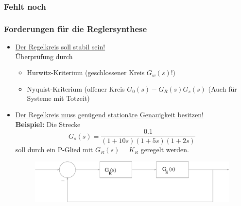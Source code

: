 \message{ !name(Mitschrieb_SysRegel.tex)}\documentclass[12pt,a4paper,ngerman]{scrartcl}
\newcommand{\RM}[1]{\MakeUppercase{\romannumeral #1{.}}}
\begin{document}
\subsubsection{Fehlt noch}
\subsubsection{Forderungen für die Reglersynthese}
\begin{itemize}
\item[\RM{1}] \underline{Der Regelkreis soll stabil sein!}\\
Überprüfung durch
\begin{itemize}
\item Hurwitz-Kriterium (geschlossener Kreis $G_w(s)$!)
\item Nyquist-Kriterium (offener Kreis $G_0(s)-G_R(s)G_s(s)$ (Auch für Systeme mit Totzeit)
\end{itemize}
\item[\RM{2}] \underline{Der Regelkreis muss genügend stationäre Genauigkeit besitzen!}\\
\textbf{Beispiel:} Die Strecke
\[
G_s(s)=\frac{0.1}{(1+10s)(1+5s)(1+2s)}
\]
soll durch ein P-Glied mit $G_R(s)=K_R$ geregelt werden.
\begin{figure}[H]
  \centering
  \includegraphics[width=.7\linewidth]{sysregel_No_1}
\end{figure}


\end{itemize}
\end{document}
